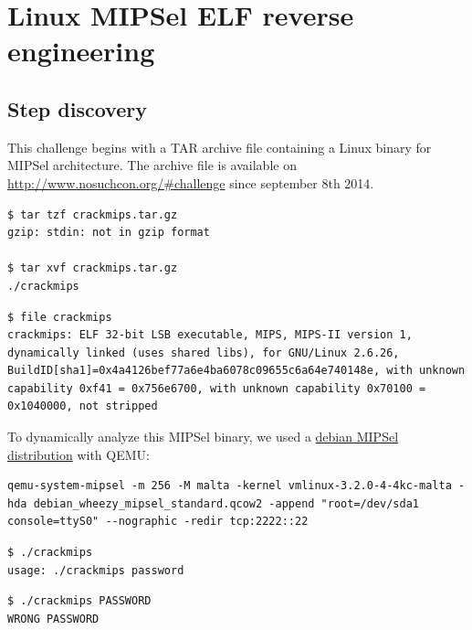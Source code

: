 \documentclass[a4paper]{article}
\begin{document}
\newpage
\listoffigures
\lstlistoflistings

\newpage


\section{Linux MIPSel ELF reverse engineering}
\subsection{Step discovery}

This challenge begins with a TAR archive file containing a Linux binary for MIPSel architecture. The archive file is available on \href{http://www.nosuchcon.org/#challenge}{http://www.nosuchcon.org/\#challenge} since september 8th 2014.


\begin{lstlisting}[caption={},numbers=none,style=colortilde]
$ tar tzf crackmips.tar.gz
gzip: stdin: not in gzip format

$ tar xvf crackmips.tar.gz
./crackmips
\end{lstlisting}

\begin{lstlisting}[caption={},numbers=none]
$ file crackmips
crackmips: ELF 32-bit LSB executable, MIPS, MIPS-II version 1, dynamically linked (uses shared libs), for GNU/Linux 2.6.26, BuildID[sha1]=0x4a4126bef77a6e4ba6078c09655c6a64e740148e, with unknown capability 0xf41 = 0x756e6700, with unknown capability 0x70100 = 0x1040000, not stripped
\end{lstlisting}

To dynamically analyze this MIPSel binary, we used a \href{https://people.debian.org/~aurel32/qemu/mipsel/}{debian MIPSel distribution} with QEMU:

\begin{lstlisting}[caption={},numbers=none]
qemu-system-mipsel -m 256 -M malta -kernel vmlinux-3.2.0-4-4kc-malta -hda debian_wheezy_mipsel_standard.qcow2 -append "root=/dev/sda1 console=ttyS0" --nographic -redir tcp:2222::22
\end{lstlisting}

\begin{lstlisting}[caption={},numbers=none]
$ ./crackmips
usage: ./crackmips password
\end{lstlisting}

\begin{lstlisting}[caption={},numbers=none]
$ ./crackmips PASSWORD
WRONG PASSWORD
\end{lstlisting}
\end{document}
